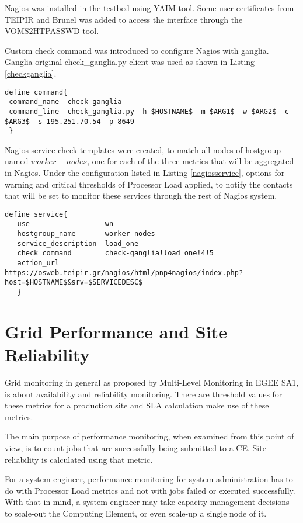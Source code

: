 Nagios was installed in the testbed using YAIM tool. Some user certificates from TEIPIR and Brunel was added to access the interface through the VOMS2HTPASSWD tool.

Custom check command was introduced to configure Nagios with ganglia. Ganglia original check\_ganglia.py client was used as shown in Listing \ref{checkganglia}.

\begin{lstlisting}[label=checkganglia]
define command{
 command_name  check-ganglia
 command_line  check_ganglia.py -h $HOSTNAME$ -m $ARG1$ -w $ARG2$ -c $ARG3$ -s 195.251.70.54 -p 8649
 }
\end{lstlisting}

Nagios service check templates were created, to match all nodes of hostgroup named $worker-nodes$, one for each of the three metrics that will be aggregated in Nagios. Under the configuration listed in Listing \ref{nagiosservice}, options for warning and critical thresholds of Processor Load applied, to notify the contacts that will be set to monitor these services through the rest of Nagios system.

\begin{lstlisting}[label=nagiosservice]
define service{
   use                  wn
   hostgroup_name       worker-nodes
   service_description  load_one
   check_command        check-ganglia!load_one!4!5
   action_url           https://osweb.teipir.gr/nagios/html/pnp4nagios/index.php?host=$HOSTNAME$&srv=$SERVICEDESC$
   }
\end{lstlisting}

\section{Grid Performance and Site Reliability}

Grid monitoring in general as proposed by Multi-Level Monitoring in EGEE SA1, is about availability and reliability monitoring. There are threshold values for these metrics for a production site and SLA calculation make use of these metrics.

The main purpose of performance monitoring, when examined from this point of view, is to count jobs that are successfully being submitted to a CE. Site reliability is calculated using that metric.

For a system engineer, performance monitoring for system administration has to do with Processor Load metrics and not with jobs failed or executed successfully. With that in mind, a system engineer may take capacity management decisions to scale-out the Computing Element, or even scale-up a single node of it.

